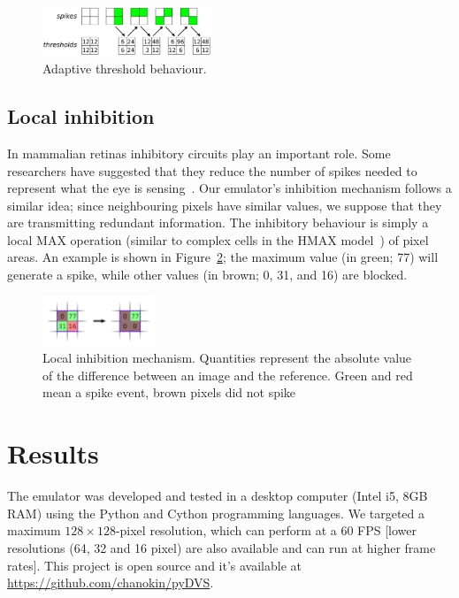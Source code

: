 \documentclass[conference]{IEEEtran}
\begin{document}
%
\begin{figure}[hbt]
  \centering
  \includegraphics[width=0.45\textwidth]{adaptive_thresh_boxes}
  \caption{Adaptive threshold behaviour.}
  \label{fig:adpt_thresh}
\end{figure}

\subsection{Local inhibition} 
In mammalian retinas inhibitory circuits play an important role. Some researchers have suggested that they reduce the number of spikes needed to represent what the eye is sensing~\cite{basab}. Our emulator's inhibition mechanism follows a similar idea; since neighbouring pixels have similar values, we suppose that they are transmitting redundant information. The inhibitory behaviour is simply a local MAX operation (similar to complex cells in the HMAX model~\cite{riesenhuber1999hierarchical}) of pixel areas. An example is shown in Figure~\ref{fig:local_inh}; the maximum value (in green; 77) will generate a spike, while other values (in brown; 0, 31, and 16) are blocked.

\begin{figure}[htb]
\centering
    \includegraphics[width=0.3\textwidth]{inh_local_max_img}
    \caption{Local inhibition mechanism. Quantities represent the absolute value of the difference between an image and the reference. Green and red mean a spike event, brown pixels did not spike}

  \label{fig:local_inh}
\end{figure}

\section{Results}
\label{sec:results}
The emulator was developed and tested in a desktop computer (Intel i5, 8GB RAM) using the Python and Cython programming languages. We targeted a maximum $128\times 128$-pixel resolution, which can perform at a 60 FPS [lower resolutions (64, 32 and 16 pixel) are also available and can run at higher frame rates]. This project is open source and it's available at \url{https://github.com/chanokin/pyDVS}.
\end{document}
